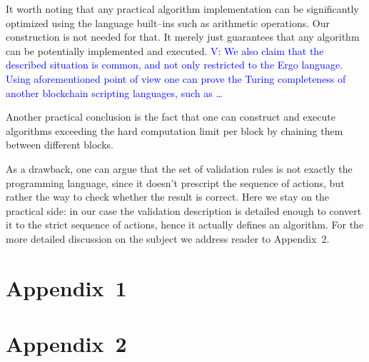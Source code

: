 \documentclass[runningheads]{llncs}
\newcommand{\vk}[1]{\textcolor{blue}{V: {#1}}}
\begin{document}
    It worth noting that any practical algorithm implementation can be
    significantly optimized using the language built--ins such as arithmetic
    operations. Our construction is not needed for that. It merely just
    guarantees that any algorithm can be potentially implemented and executed.
    \vk{We also claim that the described situation is common, and not only
    restricted to the Ergo language. Using aforementioned point of view one
    can prove the Turing completeness of another blockchain scripting
    languages, such as \ldots}

    Another practical conclusion is the fact that one can construct and execute
    algorithms exceeding the hard computation limit per block by chaining them
    between different blocks.

    As a drawback, one can argue that the set of validation rules is not exactly
    the programming language, since it doesn't prescript the sequence of actions,
    but rather the way to check whether the result is correct. Here we stay on the
    practical side: in our case the validation description is detailed enough to
    convert it to the strict sequence of actions, hence it actually defines an
    algorithm. For the more detailed discussion on the subject we address reader
    to Appendix~2.

    

    \section{Appendix~1}
    \label{appendix1}

    \section{Appendix~2}
    \label{appendix2}

\end{document}
